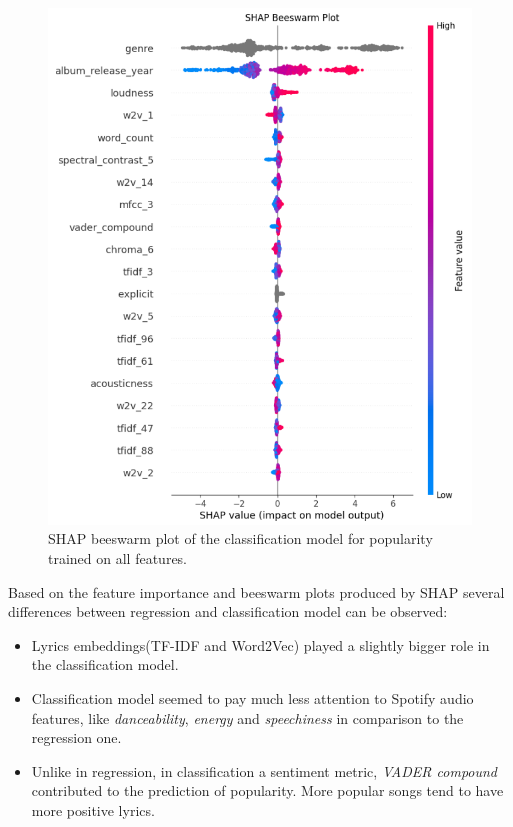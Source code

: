 \begin{center}
\begin{figure}[H]
  \centering
  \includegraphics[width=5in]{img/beeswarm_popularity_clf.png}
  \caption{SHAP beeswarm plot of the classification model for popularity trained on all features.}
  \label{Figure:fig_beh}
\end{figure}
\end{center}


Based on the feature importance and beeswarm plots produced by SHAP 
several differences between regression and classification model can
be observed:
\begin{itemize}
  \item Lyrics embeddings(TF-IDF and Word2Vec) played a slightly bigger role in
    the classification model.
  \item Classification model seemed to pay much less attention to Spotify audio
    features, like \textit{danceability}, \textit{energy} and
    \textit{speechiness} in comparison to the regression one.
  \item Unlike in regression, in classification a sentiment metric,
    \textit{VADER compound} contributed to the prediction of popularity. More
    popular songs tend to have more positive lyrics.
\end{itemize}



